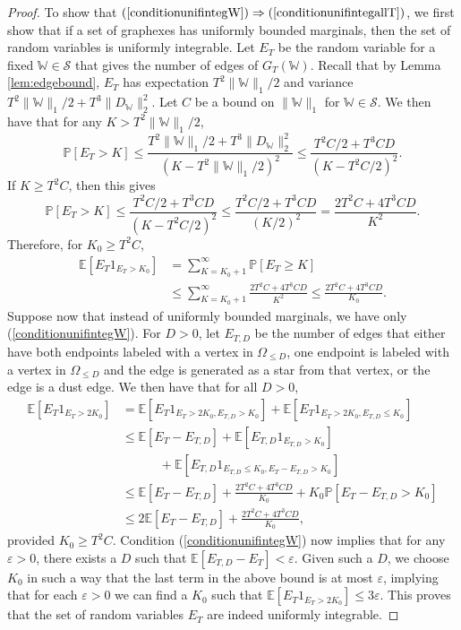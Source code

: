 \documentclass{amsart}
\numberwithin{equation}{section}
\numberwithin{figure}{section}
\theoremstyle{definition}
\theoremstyle{remark}
\newcommand{\eps}{\varepsilon}
\newcommand{\EE}{\mathbb{E}}
\newcommand{\PP}{\mathbb{P}}
\newcommand{\cW}{\mathbb{W}}
\newcommand{\cS}{\mathcal{S}}
\begin{document}
\begin{proof}
To show that $(\ref{conditionunifintegW}) \Rightarrow
(\ref{conditionunifintegallT})$, we first show that if a set of graphexes has
uniformly bounded marginals, then the set of random variables is uniformly
integrable. Let $E_T$ be the random variable for a fixed $\cW \in \cS$ that
gives the number of edges of $G_T(\cW)$. Recall that by Lemma
\ref{lem:edgebound}, $E_T$ has expectation $T^2\|\cW\|_1/2$ and variance
$T^2\|\cW\|_1/2+T^3\|D_\cW\|_2^2$. Let $C$ be a bound on $\|\cW\|_1$ for $\cW
\in \cS$. We then have that for any $K>T^2\|\cW\|_1/2$,
\[
\PP[E_T>K] \le
\frac{T^2\|\cW\|_1/2+T^3\|D_\cW\|_2^2}{(K-T^2\|\cW\|_1/2)^2} \le
\frac{T^2C/2+T^3CD}{(K-T^2C/2)^2}
.
\]
If $K\ge T^2C$, then this gives
\[\PP[E_T>K] \le \frac{T^2C/2+T^3CD}{(K-T^2C/2)^2} \le \frac{T^2C/2+T^3CD}{(K/2)^2} = \frac{2T^2C+4T^3CD}{K^2}
.
\]
Therefore, for $K_0 \ge T^2C$,
\begin{align*}
\EE[E_T1_{E_T> K_0}] &=\sum_{K=K_0+1}^\infty \PP[E_T \ge K]\\
& \le \sum_{K=K_0+1}^\infty \frac{2T^2C+4T^3CD}{K^2}
\le \frac{2T^2C+4T^3CD}{K_0}
.
\end{align*}
Suppose now that instead of uniformly bounded marginals, we have only
(\ref{conditionunifintegW}). For $D>0$, let $E_{T,D}$ be the number of edges
that either have both endpoints labeled with a vertex in $\Omega_{\le D}$,
one endpoint is labeled with a vertex in $\Omega_{\le D}$ and the edge is
generated as a star from that vertex, or the edge is a dust edge. We then
have that for all $D>0$,
\begin{align*}
\EE[E_T1_{E_T>2K_0}] &=
\EE[E_{T}1_{E_T>2K_0,E_{T,D}>K_0}]+ \EE[E_{T}1_{E_T>2K_0,E_{T,D}\le K_0}]
\\
&\le \EE[E_T-E_{T,D}]+ \EE[E_{T,D}1_{E_{T,D}>K_0}]\\
& \qquad \quad \phantom{}+ \EE[E_{T,D}1_{E_{T,D}\le K_0,E_T-E_{T,D}>K_0}]
\\
&\le \EE[E_T-E_{T,D}]+ \frac{2T^2C+4T^3CD}{K_0}+ K_0 \PP[E_{T}-E_{T,D}>K_0]
\\
&\le 2\EE[E_T-E_{T,D}]+ \frac{2T^2C+4T^3CD}{K_0}
,
\end{align*}
provided $K_0 \ge T^2C$. Condition (\ref{conditionunifintegW}) now implies
that for any $\eps>0$, there exists a $D$ such that
$\EE[E_{T,D}-E_T]<\varepsilon$. Given such a $D$, we choose $K_0$ in such a
way that the last term in the above bound is at most $\eps$, implying that
for each $\eps>0$ we can find a $K_0$ such that $\EE[E_T1_{E_T>2K_0}]\leq
3\eps$. This proves that the set of random variables $E_T$ are indeed
uniformly integrable.


\end{proof}
\end{document}
